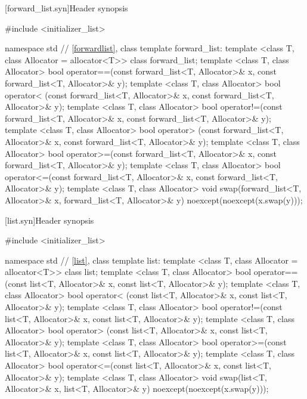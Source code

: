 [forward_list.syn]{Header  synopsis}


\begin{codeblock}
#include <initializer_list>

namespace std {
  // \ref{forwardlist}, class template forward_list:
  template <class T, class Allocator = allocator<T>> class forward_list;
  template <class T, class Allocator>
    bool operator==(const forward_list<T, Allocator>& x, const forward_list<T, Allocator>& y);
  template <class T, class Allocator>
    bool operator< (const forward_list<T, Allocator>& x, const forward_list<T, Allocator>& y);
  template <class T, class Allocator>
    bool operator!=(const forward_list<T, Allocator>& x, const forward_list<T, Allocator>& y);
  template <class T, class Allocator>
    bool operator> (const forward_list<T, Allocator>& x, const forward_list<T, Allocator>& y);
  template <class T, class Allocator>
    bool operator>=(const forward_list<T, Allocator>& x, const forward_list<T, Allocator>& y);
  template <class T, class Allocator>
    bool operator<=(const forward_list<T, Allocator>& x, const forward_list<T, Allocator>& y);
  template <class T, class Allocator>
    void swap(forward_list<T, Allocator>& x, forward_list<T, Allocator>& y)
      noexcept(noexcept(x.swap(y)));
}
\end{codeblock}

[list.syn]{Header  synopsis}


\begin{codeblock}
#include <initializer_list>

namespace std {
  // \ref{list}, class template list:
  template <class T, class Allocator = allocator<T>> class list;
  template <class T, class Allocator>
    bool operator==(const list<T, Allocator>& x, const list<T, Allocator>& y);
  template <class T, class Allocator>
    bool operator< (const list<T, Allocator>& x, const list<T, Allocator>& y);
  template <class T, class Allocator>
    bool operator!=(const list<T, Allocator>& x, const list<T, Allocator>& y);
  template <class T, class Allocator>
    bool operator> (const list<T, Allocator>& x, const list<T, Allocator>& y);
  template <class T, class Allocator>
    bool operator>=(const list<T, Allocator>& x, const list<T, Allocator>& y);
  template <class T, class Allocator>
    bool operator<=(const list<T, Allocator>& x, const list<T, Allocator>& y);
  template <class T, class Allocator>
    void swap(list<T, Allocator>& x, list<T, Allocator>& y)
      noexcept(noexcept(x.swap(y)));
}
\end{codeblock}

